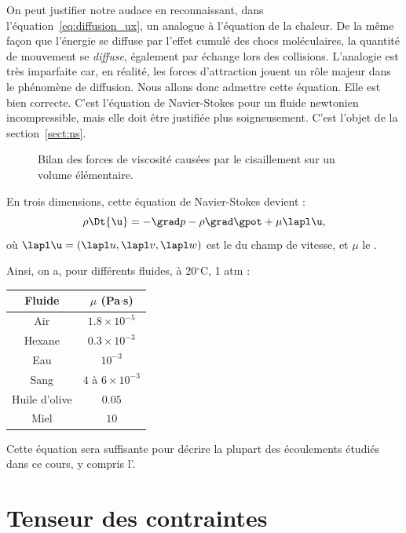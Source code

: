 On peut justifier notre audace en reconnaissant, dans l'équation~\eqref{eq:diffusion_ux}, un analogue à l'équation de la chaleur. De la même façon que l'énergie se diffuse par l'effet cumulé des chocs moléculaires, la quantité de mouvement se \emph{diffuse}, également par échange lors des collisions. L'analogie est très imparfaite car, en réalité, les forces d'attraction jouent un rôle majeur dans le phénomène de diffusion. Nous allons donc admettre cette équation. Elle est bien correcte. C'est l'équation de Navier-Stokes pour un fluide newtonien incompressible, mais elle doit être justifiée plus soigneusement. C'est l'objet de la section~\ref{sect:ns}.

\begin{figure}
  \begin{center}
    
  \end{center}
  \caption{Bilan des forces de viscosité causées par le cisaillement sur un volume élémentaire.}
\end{figure}

En trois dimensions, cette équation de Navier-Stokes devient :
\begin{displaymath}
  \rho \Dt{\u} = -\grad p - \rho \grad \gpot + \mu \lapl \u,
\end{displaymath}
où $\lapl \u = (\lapl u, \lapl v, \lapl w)$ est le  du champ de vitesse, et $\mu$ le .

Ainsi, on a, pour différents fluides, à 20$^\circ$C, 1 atm :

\begin{tabular}{|c|c|}
\hline
Fluide & $\mu$ (Pa$\cdot$s) \\
\hline
Air & $1.8 \times 10^{-5}$ \\
Hexane & $0.3 \times 10^{-3}$ \\
Eau & $10^{-3}$ \\
Sang & $4$ à $6 \times 10^{-3}$ \\
Huile d'olive & $0.05$ \\
Miel & $10$ \\
\hline
\end{tabular}

Cette équation sera suffisante pour décrire la plupart des écoulements étudiés dans ce cours, y compris l'.

\section{Tenseur des contraintes}

